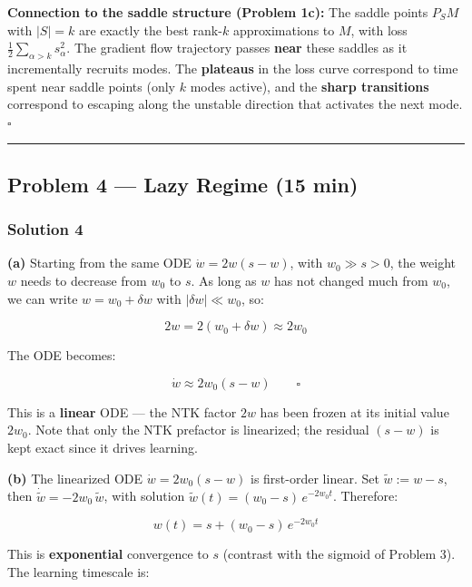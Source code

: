 \documentclass[
]{article}
\begin{document}
\textbf{Connection to the saddle structure (Problem 1c):} The saddle
points \(P_S M\) with \(|S| = k\) are exactly the best rank-\(k\)
approximations to \(M\), with loss
\(\frac{1}{2}\sum_{\alpha > k} s_\alpha^2\). The gradient flow
trajectory passes \textbf{near} these saddles as it incrementally
recruits modes. The \textbf{plateaus} in the loss curve correspond to
time spent near saddle points (only \(k\) modes active), and the
\textbf{sharp transitions} correspond to escaping along the unstable
direction that activates the next mode. \(\square\)

\begin{center}\rule{0.5\linewidth}{0.5pt}\end{center}

\subsection{Problem 4 --- Lazy Regime (15
min)}\label{problem-4-lazy-regime-15-min}

\subsubsection{Solution 4}\label{solution-4}

\textbf{(a)} Starting from the same ODE \(\dot{w} = 2w(s - w)\), with
\(w_0 \gg s > 0\), the weight \(w\) needs to decrease from \(w_0\) to
\(s\). As long as \(w\) has not changed much from \(w_0\), we can write
\(w = w_0 + \delta w\) with \(|\delta w| \ll w_0\), so:

\[2w = 2(w_0 + \delta w) \approx 2w_0\]

The ODE becomes:

\[\dot{w} \approx 2w_0(s - w) \qquad \square\]

This is a \textbf{linear} ODE --- the NTK factor \(2w\) has been frozen
at its initial value \(2w_0\). Note that only the NTK prefactor is
linearized; the residual \((s - w)\) is kept exact since it drives
learning.

\textbf{(b)} The linearized ODE \(\dot{w} = 2w_0(s - w)\) is first-order
linear. Set \(\tilde{w} := w - s\), then
\(\dot{\tilde{w}} = -2w_0\,\tilde{w}\), with solution
\(\tilde{w}(t) = (w_0 - s)\,e^{-2w_0 t}\). Therefore:

\[\boxed{w(t) = s + (w_0 - s)\,e^{-2w_0 t}}\]

This is \textbf{exponential} convergence to \(s\) (contrast with the
sigmoid of Problem 3). The learning timescale is:
\end{document}
